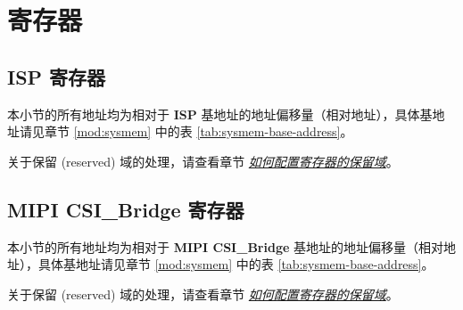 \documentclass[main\_\_CN.tex]{subfiles}
\begin{document}





\newpage
\section{寄存器}

\subsection{ISP 寄存器}

本小节的所有地址均为相对于 \textbf{ISP} 基地址的地址偏移量（相对地址），具体基地址请见章节 \ref{mod:sysmem} \textit{} 中的表 \ref{tab:sysmem-base-address}。

关于保留 (reserved) 域的处理，请查看章节 \hyperref[programming-reserved-field]{\textit{如何配置寄存器的保留域}}。




\subsection{MIPI CSI\_Bridge 寄存器}

本小节的所有地址均为相对于 \textbf{MIPI CSI\_Bridge} 基地址的地址偏移量（相对地址），具体基地址请见章节 \ref{mod:sysmem} \textit{} 中的表 \ref{tab:sysmem-base-address}。

关于保留 (reserved) 域的处理，请查看章节 \hyperref[programming-reserved-field]{\textit{如何配置寄存器的保留域}}。


\end{document}
